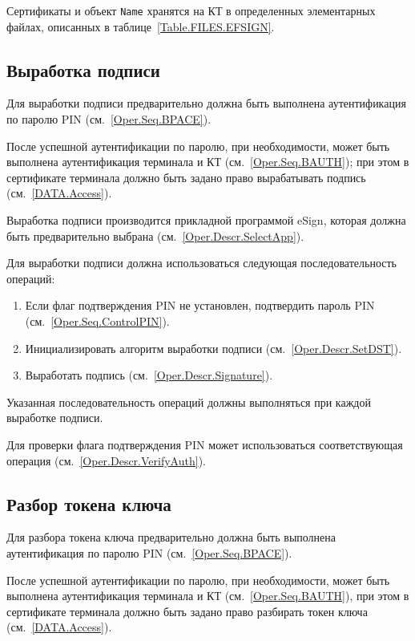 Сертификаты и объект \texttt{Name} 
хранятся на КТ в определенных элементарных файлах, 
описанных в таблице~\ref{Table.FILES.EFSIGN}.

\subsection{Выработка подписи}
\label{Oper.Seq.Sig}

Для выработки подписи предварительно 
должна быть выполнена аутентификация по 
паролю PIN (см.~\ref{Oper.Seq.BPACE}).

После успешной аутентификации по паролю,
при необходимости, может быть выполнена 
аутентификация терминала и КТ (см.~\ref{Oper.Seq.BAUTH});
при этом в сертификате терминала должно быть задано право
вырабатывать подпись (см.~\ref{DATA.Access}).

Выработка подписи производится прикладной программой eSign, которая
должна быть предварительно выбрана (см.~\ref{Oper.Descr.SelectApp}).

Для выработки подписи  должна использоваться 
следующая последовательность операций:
%
\begin{enumerate}
\item Если флаг подтверждения PIN не установлен,
      подтвердить пароль PIN (см.~\ref{Oper.Seq.ControlPIN}).
\item Инициализировать алгоритм выработки подписи (см.~\ref{Oper.Descr.SetDST}).
\item Выработать подпись (см.~\ref{Oper.Descr.Signature}).
\end{enumerate}
%
Указанная последовательность операций должны выполняться
при каждой выработке подписи.

Для проверки флага подтверждения PIN может использоваться 
соответствующая операция (см.~\ref{Oper.Descr.VerifyAuth}).

\subsection{Разбор токена ключа}
\label{Oper.Seq.Decipher}

Для разбора токена ключа предварительно 
должна быть выполнена аутентификация по 
паролю PIN (см.~\ref{Oper.Seq.BPACE}).

После успешной аутентификации по паролю,
при необходимости, может быть выполнена аутентификация 
терминала и КТ (см.~\ref{Oper.Seq.BAUTH}),
при этом в сертификате терминала должно быть задано право
разбирать токен ключа (см.~\ref{DATA.Access}).

